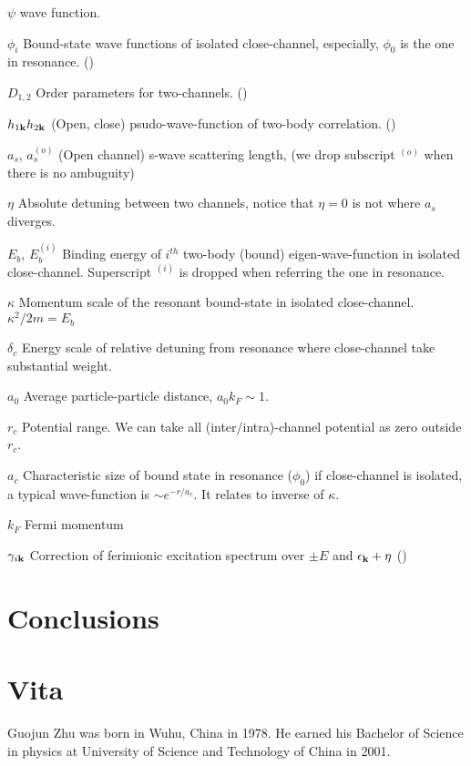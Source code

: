 \documentclass[edeposit,fullpage]{uiucthesis2009}
\begin{document}
\begin{symbollist}[0.7in]
\item[$\psi$] wave function.
\item[$\phi_{i}$] Bound-state wave functions of  isolated close-channel, especially, $\phi_{0}$ is the one in resonance. (\pageref{eq:pathInt2:phi})
\item[$D_{1,2}$] Order parameters for two-channels. (\pageref{eq:pathInt2:Ddef})
\item[$h_{1\mathbf{k}} h_{2\mathbf{k}}$] (Open, close) psudo-wave-function of two-body correlation. (\pageref{eq:pathInt2:h2})
\item[$a_{s}$, $a_{s}^{(o)}$] (Open channel) s-wave scattering length, (we drop subscript ${}^{(o)}$ when there is no ambuguity) 
\item[$\eta$] Absolute detuning between two channels, notice that $\eta=0$ is not where $a_{s}$ diverges.
\item[$E_{b}$, $E_{b}^{(i)}$] Binding energy of $i^{th}$ two-body (bound) eigen-wave-function in isolated close-channel.  Superscript ${}^{(i)}$ is dropped when referring the one in resonance. 
\item[$\kappa$] Momentum scale of the resonant bound-state in isolated close-channel.  $\kappa^{2}/2m=E_{b}$
\item[$\delta_{c}$] Energy scale of relative detuning from resonance where close-channel take substantial weight.
\item[$a_{0}$] Average particle-particle distance, $a_{0}k_{F}\sim1$.
\item[$r_{c}$] Potential range.  We can take all (inter/intra)-channel potential as zero outside $r_{c}$.
\item[$a_{c}$] Characteristic size of bound state in resonance ($\phi_{0}$) if close-channel is isolated, a typical wave-function is $\sim{}e^{-r/a_{c}}$. It relates to inverse of $\kappa$.
\item[$k_{F}$] Fermi momentum
\item[$\gamma_{i\mathbf{k}}$] Correction of ferimionic excitation spectrum over $\pm{}E$ and $\epsilon_{\mathbf{k}}+\eta$ (\pageref{eq:pathInt2:xiExpand})
\end{symbollist}

\mainmatter




\chapter{Conclusions\label{ch:conclusion}}


\appendix

%



\backmatter



\chapter{Vita}

Guojun  Zhu was born in Wuhu, China in 1978.  He earned his Bachelor of Science in physics at University of Science and Technology of China in 2001.  
\end{document}
